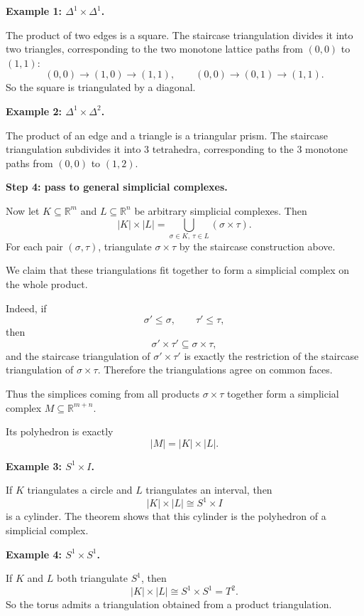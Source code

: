 \documentclass[12pt,a4paper]{article}
\theoremstyle{notespace}
\begin{document}
\textbf{Example 1: \(\Delta^1\times \Delta^1\).}

The product of two edges is a square. The staircase triangulation divides it into two triangles, corresponding to the two monotone lattice paths from \((0,0)\) to \((1,1)\):
\[
(0,0)\to (1,0)\to (1,1),
\qquad
(0,0)\to (0,1)\to (1,1).
\]
So the square is triangulated by a diagonal.

\medskip

\textbf{Example 2: \(\Delta^1\times \Delta^2\).}

The product of an edge and a triangle is a triangular prism. The staircase triangulation subdivides it into \(3\) tetrahedra, corresponding to the \(3\) monotone paths from \((0,0)\) to \((1,2)\).

\medskip

\textbf{Step 4: pass to general simplicial complexes.}

Now let \(K\subseteq \mathbb R^m\) and \(L\subseteq \mathbb R^n\) be arbitrary simplicial complexes. Then
\[
|K|\times |L|
=
\bigcup_{\sigma\in K,\ \tau\in L} (\sigma\times\tau).
\]
For each pair \((\sigma,\tau)\), triangulate \(\sigma\times\tau\) by the staircase construction above.

We claim that these triangulations fit together to form a simplicial complex on the whole product.

Indeed, if
\[
\sigma'\le \sigma,
\qquad
\tau'\le \tau,
\]
then
\[
\sigma'\times\tau' \subseteq \sigma\times\tau,
\]
and the staircase triangulation of \(\sigma'\times\tau'\) is exactly the restriction of the staircase triangulation of \(\sigma\times\tau\). Therefore the triangulations agree on common faces.

Thus the simplices coming from all products \(\sigma\times\tau\) together form a simplicial complex \(M\subseteq \mathbb R^{m+n}\).

Its polyhedron is exactly
\[
|M|=|K|\times |L|.
\]

\medskip

\textbf{Example 3: \(S^1\times I\).}

If \(K\) triangulates a circle and \(L\) triangulates an interval, then
\[
|K|\times |L| \cong S^1\times I
\]
is a cylinder. The theorem shows that this cylinder is the polyhedron of a simplicial complex.

\medskip

\textbf{Example 4: \(S^1\times S^1\).}

If \(K\) and \(L\) both triangulate \(S^1\), then
\[
|K|\times |L| \cong S^1\times S^1=T^2.
\]
So the torus admits a triangulation obtained from a product triangulation.
\end{document}
